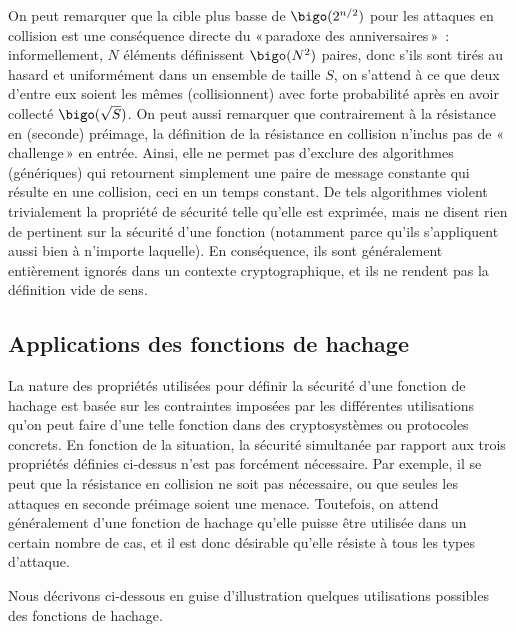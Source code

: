 On peut remarquer que la cible plus basse de 
$\bigo(2^{n/2})$ pour les attaques en collision est une conséquence directe du
«\,paradoxe des anniversaires\,»~: informellement, 
$N$ éléments définissent $\bigo(N^2)$ paires, donc s'ils sont tirés au hasard et uniformément dans un ensemble de taille $S$,
on s'attend à ce que deux d'entre eux soient les mêmes (collisionnent) avec forte probabilité après en avoir collecté
$\bigo(\sqrt{S})$. 
On peut aussi remarquer que contrairement à la résistance en (seconde) préimage, la définition de la résistance en collision n'inclus pas de «\,challenge\,» en entrée.
Ainsi, elle ne permet pas d'exclure des algorithmes (génériques) qui retournent simplement une paire de message constante qui résulte en une collision, ceci en un temps constant.
De tels algorithmes violent trivialement la propriété de sécurité telle qu'elle est exprimée, mais ne disent rien de pertinent sur la sécurité d'une fonction (notamment parce qu'ils
s'appliquent aussi bien à n'importe laquelle). En conséquence, ils sont généralement entièrement ignorés dans un contexte cryptographique, et ils ne rendent pas la
définition vide de sens.

\subsection{Applications des fonctions de hachage}

La nature des propriétés utilisées pour définir la sécurité d'une fonction de hachage est basée sur les contraintes imposées par les différentes utilisations qu'on peut faire
d'une telle fonction dans des cryptosystèmes ou protocoles concrets.
En fonction de la situation, la sécurité simultanée par rapport aux trois propriétés définies ci-dessus n'est pas forcément nécessaire. Par exemple, il se peut que la résistance
en collision ne soit pas nécessaire, ou que seules les attaques en seconde préimage soient une menace. Toutefois, on attend généralement d'une fonction de hachage qu'elle puisse être utilisée
dans un certain nombre de cas, et il est donc désirable qu'elle résiste à tous les types d'attaque.

Nous décrivons ci-dessous en guise d'illustration quelques utilisations possibles des fonctions de hachage.

